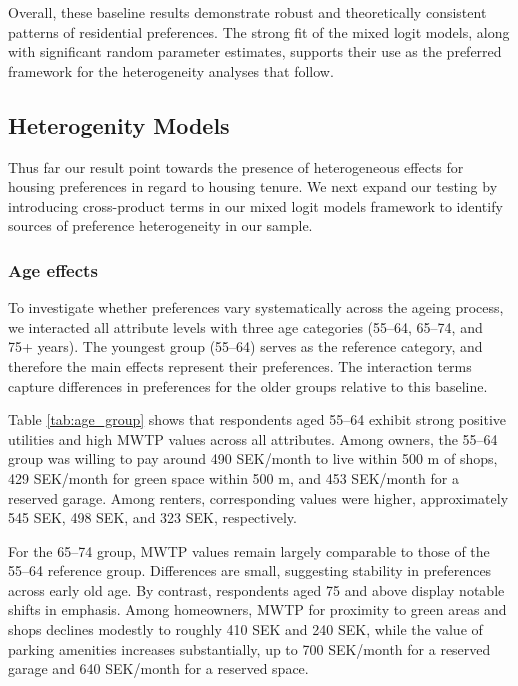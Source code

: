 \documentclass[3p,11pt ]{elsarticle}
\begin{document}
Overall, these baseline results demonstrate robust and theoretically consistent patterns of residential preferences. The strong fit of the mixed logit models, along with significant random parameter estimates, supports their use as the preferred framework for the heterogeneity analyses that follow.





\clearpage


\subsection{Heterogenity Models}

Thus far our result point towards the presence of heterogeneous effects for housing preferences in regard to housing tenure. 
We next expand our testing by introducing cross-product terms in our mixed logit models framework to identify sources of preference heterogeneity in our sample.

\subsubsection{Age effects}

To investigate whether preferences vary systematically across the ageing process, we interacted all attribute levels with three age categories (55–64, 65–74, and 75+ years). The youngest group (55–64) serves as the reference category, and therefore the main effects represent their preferences. The interaction terms capture differences in preferences for the older groups relative to this baseline.

Table \ref{tab:age_group} shows that respondents aged 55–64 exhibit strong positive utilities and high MWTP values across all attributes. Among owners, the 55–64 group was willing to pay around 490 SEK/month to live within 500 m of shops, 429 SEK/month for green space within 500 m, and 453 SEK/month for a reserved garage. Among renters, corresponding values were higher, approximately 545 SEK, 498 SEK, and 323 SEK, respectively.

For the 65–74 group, MWTP values remain largely comparable to those of the 55–64 reference group. Differences are small, suggesting stability in preferences across early old age.
By contrast, respondents aged 75 and above display notable shifts in emphasis.
Among homeowners, MWTP for proximity to green areas and shops declines modestly to roughly 410 SEK and 240 SEK, while the value of parking amenities increases substantially, 
up to 700 SEK/month for a reserved garage and 640 SEK/month for a reserved space.
\end{document}
